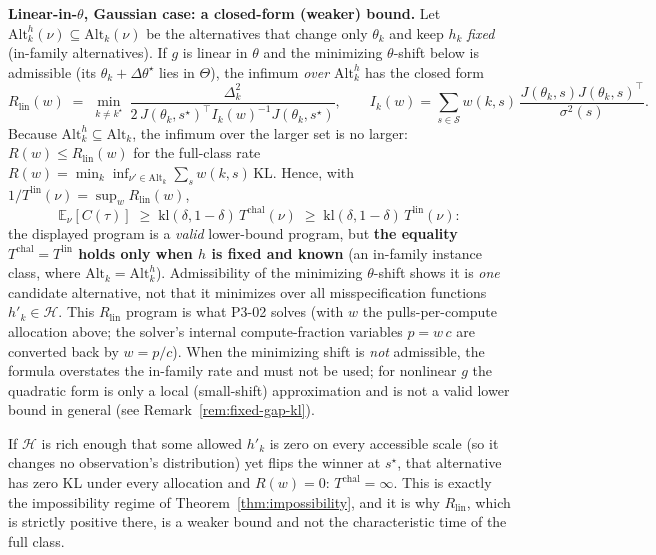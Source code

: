 \begin{theorem}
\textbf{Linear-in-$\theta$, Gaussian case: a closed-form (weaker) bound.} Let
$\mathrm{Alt}^{h}_k(\nu) \subseteq \mathrm{Alt}_k(\nu)$ be the alternatives that change
only $\theta_k$ and keep $h_k$ \emph{fixed} (in-family alternatives). If $g$ is linear
in $\theta$ and the minimizing $\theta$-shift below is admissible (its $\theta_k +
\Delta\theta^\star$ lies in $\Theta$), the infimum \emph{over $\mathrm{Alt}^h_k$} has the
closed form
\[
  R_{\mathrm{lin}}(w) \;=\; \min_{k \ne k^\star} \
  \frac{\Delta_k^2}{2 \, J(\theta_k, s^\star)^\top I_k(w)^{-1} J(\theta_k, s^\star)},
  \qquad
  I_k(w) = \sum_{s \in \mathcal{S}} w(k, s) \, \frac{J(\theta_k, s) J(\theta_k, s)^\top}{\sigma^2(s)}.
\]
Because $\mathrm{Alt}^h_k \subseteq \mathrm{Alt}_k$, the infimum over the larger set is no
larger: $R(w) \le R_{\mathrm{lin}}(w)$ for the full-class rate $R(w) = \min_{k}
\inf_{\nu' \in \mathrm{Alt}_k} \sum_s w(k,s)\,\mathrm{KL}$. Hence, with
$1/T^{\mathrm{lin}}(\nu) = \sup_w R_{\mathrm{lin}}(w)$,
\[
  \mathbb{E}_\nu[C(\tau)] \;\ge\; \mathrm{kl}(\delta, 1-\delta)\, T^{\mathrm{chal}}(\nu)
  \;\ge\; \mathrm{kl}(\delta, 1-\delta)\, T^{\mathrm{lin}}(\nu):
\]
the displayed program is a \emph{valid} lower-bound program, but \textbf{the equality
$T^{\mathrm{chal}} = T^{\mathrm{lin}}$ holds only when $h$ is fixed and known} (an
in-family instance class, where $\mathrm{Alt}_k = \mathrm{Alt}^h_k$). Admissibility of
the minimizing $\theta$-shift shows it is \emph{one} candidate alternative, not that it
minimizes over all misspecification functions $h'_k \in \mathcal{H}$. This
$R_{\mathrm{lin}}$ program is what P3-02 solves (with $w$ the pulls-per-compute
allocation above; the solver's internal compute-fraction variables $p = w\,c$ are
converted back by $w = p/c$). When the minimizing shift is \emph{not} admissible, the
formula overstates the in-family rate and must not be used; for nonlinear $g$ the
quadratic form is only a local (small-shift) approximation and is not a valid lower
bound in general (see Remark~\ref{rem:fixed-gap-kl}).
\end{theorem}

\begin{remark}
\label{rem:free-h}
If $\mathcal{H}$ is rich enough that some allowed $h'_k$ is zero on every accessible scale
(so it changes no observation's distribution) yet flips the winner at $s^\star$, that
alternative has zero KL under every allocation and $R(w) = 0$: $T^{\mathrm{chal}} =
\infty$. This is exactly the impossibility regime of Theorem~\ref{thm:impossibility}, and
it is why $R_{\mathrm{lin}}$, which is strictly positive there, is a weaker bound and not the
characteristic time of the full class.
\end{remark}


